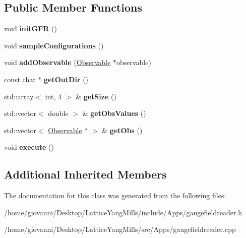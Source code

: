 \subsection*{Public Member Functions}
\begin{DoxyCompactItemize}
\item 
void {\bfseries init\+G\+FR} ()\hypertarget{classGaugeFieldReader_aa4eac4656319ffb5d397dc6dd6b4f426}{}\label{classGaugeFieldReader_aa4eac4656319ffb5d397dc6dd6b4f426}

\item 
void {\bfseries sample\+Configurations} ()\hypertarget{classGaugeFieldReader_acc45c7e6e91ccb4e1b7f8d1f65104153}{}\label{classGaugeFieldReader_acc45c7e6e91ccb4e1b7f8d1f65104153}

\item 
void {\bfseries add\+Observable} (\hyperlink{classObservable}{Observable} $\ast$observable)\hypertarget{classGaugeFieldReader_af795e0891c276b0a6c8d8ade159df3b8}{}\label{classGaugeFieldReader_af795e0891c276b0a6c8d8ade159df3b8}

\item 
const char $\ast$ {\bfseries get\+Out\+Dir} ()\hypertarget{classGaugeFieldReader_a015c7811098f42d98b7a9d5f3b52d8b4}{}\label{classGaugeFieldReader_a015c7811098f42d98b7a9d5f3b52d8b4}

\item 
std\+::array$<$ int, 4 $>$ \& {\bfseries get\+Size} ()\hypertarget{classGaugeFieldReader_a2c7cc1114b6442acdb3112409e50792f}{}\label{classGaugeFieldReader_a2c7cc1114b6442acdb3112409e50792f}

\item 
std\+::vector$<$ double $>$ \& {\bfseries get\+Obs\+Values} ()\hypertarget{classGaugeFieldReader_a470083eb93cd916886d1ea68091ee728}{}\label{classGaugeFieldReader_a470083eb93cd916886d1ea68091ee728}

\item 
std\+::vector$<$ \hyperlink{classObservable}{Observable} $\ast$ $>$ \& {\bfseries get\+Obs} ()\hypertarget{classGaugeFieldReader_a3326dd6abb58a608a387e7e91a1ed0cc}{}\label{classGaugeFieldReader_a3326dd6abb58a608a387e7e91a1ed0cc}

\item 
void {\bfseries execute} ()\hypertarget{classGaugeFieldReader_af410d62a4f0e146db40111d5be672264}{}\label{classGaugeFieldReader_af410d62a4f0e146db40111d5be672264}

\end{DoxyCompactItemize}
\subsection*{Additional Inherited Members}


The documentation for this class was generated from the following files\+:\begin{DoxyCompactItemize}
\item 
/home/giovanni/\+Desktop/\+Lattice\+Yang\+Mills/include/\+Apps/gaugefieldreader.\+h\item 
/home/giovanni/\+Desktop/\+Lattice\+Yang\+Mills/src/\+Apps/gaugefieldreader.\+cpp\end{DoxyCompactItemize}
